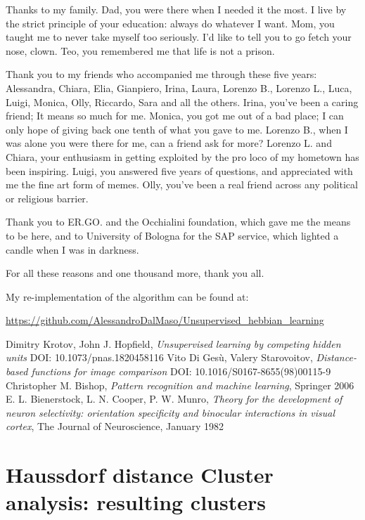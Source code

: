 \documentclass[a4paper]{report}
\begin{document}
Thanks to my family.
Dad, you were there when I needed it the most.
I live by the strict principle of your education:
always do whatever I want.
Mom, you taught me to never take myself too seriously.
I'd like to tell you to go fetch your nose, clown.
Teo, you remembered me that life is not a prison.

Thank you to my friends who accompanied me through these five years:
Alessandra, Chiara, Elia, Gianpiero, Irina, Laura, Lorenzo B., Lorenzo L., Luca, Luigi, Monica, Olly, Riccardo, Sara and all the others.
Irina, you've been a caring friend;
It means so much for me.
Monica, you got me out of a bad place;
I can only hope of giving back one tenth of what you gave to me.
Lorenzo B., when I was alone you were there for me, can a friend ask for more?
Lorenzo L. and Chiara, your enthusiasm in getting exploited by the pro loco of my hometown has been inspiring.
Luigi, you answered five years of questions, and appreciated with me the fine art form of memes.
Olly, you've been a real friend across any political or religious barrier.

Thank you to ER.GO. and the Occhialini foundation, which gave me the means to be here, and to University of Bologna for the SAP service, which lighted a candle when I was in darkness.

For all these reasons and one thousand more, thank you all.
\begin{thebibliography}{99}
My re-implementation of the algorithm can be found at:

\url{https://github.com/AlessandroDalMaso/Unsupervised\_hebbian\_learning}

Dimitry Krotov, John J. Hopfield, \textit{Unsupervised learning by competing hidden units}
DOI: 10.1073/pnas.1820458116
Vito Di Gesù, Valery Starovoitov, \textit{Distance-based functions for image comparison}
DOI: 10.1016/S0167-8655(98)00115-9
Christopher M. Bishop, \textit{Pattern recognition and machine learning}, Springer 2006
E. L. Bienerstock, L. N. Cooper, P. W. Munro, \textit{Theory for the development of neuron selectivity: orientation specificity and binocular interactions in visual cortex}, The Journal of Neuroscience, January 1982
\end{thebibliography}

\appendix

\chapter{Haussdorf distance Cluster analysis: resulting clusters}
\end{document}
